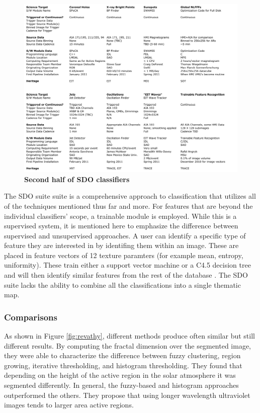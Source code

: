 \documentclass[twoside]{report}
\begin{document}
\begin{figure}[H]
  \begin{center}
    \includegraphics[scale=0.4]{sdo2.png}
    \caption{{\bf Second half of SDO classifiers} \cite{sdo}}
    \label{fig:sdo2}
 \end{center}
\end{figure}

The SDO suite suite is a comprehensive approach to classification that utilizes all of the techniques mentioned thus far and more. For features that are beyond the individual classifiers' scope, a trainable module is employed. While this is a supervised system, it is mentioned here to emphasize the difference between supervised and unsupervised approaches. A user can identify a specific type of feature they are interested in by identifing them within an image. These are placed in feature vectors of 12 texture paramters (for example mean, entropy, uniformity). These train either a support vector machine or a C4.5 decision tree and will then identify similar features from the rest of the database \cite{lamb2008example}. The SDO suite lacks the ability to combine all the classifications into a single thematic map. 

\subsubsection{Comparisons}

As shown in Figure \ref{fig:revathy}, different methods produce often similar but still different results. By computing the fractal dimension over the segmented image, they were able to characterize the difference between fuzzy clustering, region growing, iterative thresholding, and histogram thresholding. They found that depending on the height of the active region in the solar atmosphere it was segmented differently. In general, the fuzzy-based and histogram approaches outperformed the others. They propose that using longer wavelength ultraviolet images tends to larger area active regions.
\end{document}
